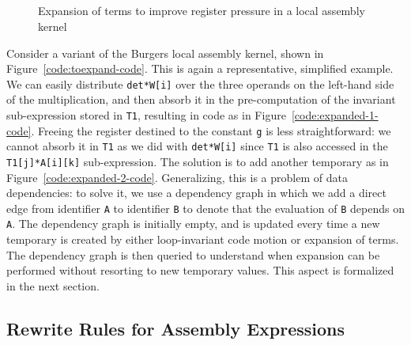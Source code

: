 
\begin{figure}
\footnotesize
{}
~\\
~\\
~\\
~\\
\caption{Expansion of terms to improve register pressure in a local assembly kernel}\label{code:expanded-code}
\end{figure}

Consider a variant of the Burgers local assembly kernel, shown in Figure~\ref{code:toexpand-code}. This is again a representative, simplified example. We can easily distribute \texttt{det*W[i]} over the three operands on the left-hand side of the multiplication, and then absorb it in the pre-computation of the invariant sub-expression stored in \texttt{T1}, resulting in code as in Figure~\ref{code:expanded-1-code}. Freeing the register destined to the constant \texttt{g} is less straightforward: we cannot absorb it in \texttt{T1} as we did with \texttt{det*W[i]} since \texttt{T1} is also accessed in the \texttt{T1[j]*A[i][k]} sub-expression. The solution is to add another temporary as in Figure~\ref{code:expanded-2-code}. Generalizing, this is a problem of data dependencies: to solve it, we use a dependency graph in which we add a direct edge from identifier \texttt{A} to identifier \texttt{B} to denote that the evaluation of \texttt{B} depends on \texttt{A}. The dependency graph is initially empty, and is updated every time a new temporary is created by either loop-invariant code motion or expansion of terms. The dependency graph is then queried to understand when expansion can be performed without resorting to new temporary values. This aspect is formalized in the next section.

\subsection{Rewrite Rules for Assembly Expressions}
\label{sec:coffee-rewrite-rules}

